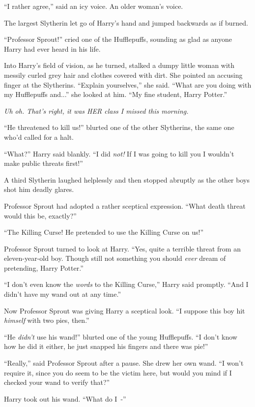 ``I rather agree,'' said an icy voice. An older woman's voice.

The largest Slytherin let go of Harry's hand and jumped backwards as if burned.

``Professor Sprout!'' cried one of the Hufflepuffs, sounding as glad as anyone Harry had ever heard in his life.

Into Harry's field of vision, as he turned, stalked a dumpy little woman with messily curled grey hair and clothes covered with dirt. She pointed an accusing finger at the Slytherins. ``Explain yourselves,'' she said. ``What are you doing with my Hufflepuffs and...'' she looked at him. ``My fine student, Harry Potter.''

\emph{Uh oh. That's right, it was HER class I missed this morning.}

``He threatened to kill us!'' blurted one of the other Slytherins, the same one who'd called for a halt.

``What?'' Harry said blankly. ``I did \emph{not!} If I was going to kill you I wouldn't make public threats first!''

A third Slytherin laughed helplessly and then stopped abruptly as the other boys shot him deadly glares.

Professor Sprout had adopted a rather sceptical expression. ``What death threat would this be, exactly?''

``The Killing Curse! He pretended to use the Killing Curse on us!''

Professor Sprout turned to look at Harry. ``Yes, quite a terrible threat from an eleven-year-old boy. Though still not something you should \emph{ever} dream of pretending, Harry Potter.''

``I don't even know the \emph{words} to the Killing Curse,'' Harry said promptly. ``And I didn't have my wand out at any time.''

Now Professor Sprout was giving Harry a sceptical look. ``I suppose this boy hit \emph{himself} with two pies, then.''

``He \emph{didn't} use his wand!'' blurted one of the young Hufflepuffs. ``I don't know how he did it either, he just snapped his fingers and there was pie!''

``Really,'' said Professor Sprout after a pause. She drew her own wand. ``I won't require it, since you do seem to be the victim here, but would you mind if I checked your wand to verify that?''

Harry took out his wand. ``What do I~-''

